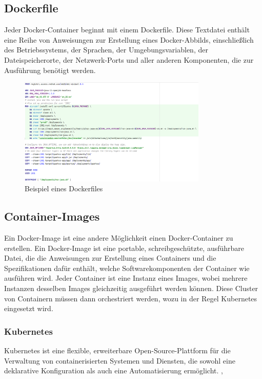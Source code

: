 \subsection{Dockerfile}
Jeder Docker-Container beginnt mit einem Dockerfile. Diese Textdatei enthält eine 
Reihe von Anweisungen zur Erstellung eines Docker-Abbilds, einschließlich des Betriebssystems, 
der Sprachen, der Umgebungsvariablen, der Dateispeicherorte, der Netzwerk-Ports und aller anderen 
Komponenten, die zur Ausführung benötigt werden.

\begin{figure}[H]
  \includegraphics[width=0.8\textwidth]{pics/Bsp_Dockerfile.PNG}
  \centering
  \caption{Beispiel eines Dockerfiles}
\end{figure}

\subsection{Container-Images}
Ein Docker-Image ist eine andere Möglichkeit einen Docker-Container zu erstellen.
Ein Docker-Image ist eine portable, schreibgeschützte, ausführbare Datei, die die Anweisungen zur 
Erstellung eines Containers und die Spezifikationen dafür enthält, welche Softwarekomponenten der 
Container wie ausführen wird. Jeder Container ist eine Instanz eines Images, wobei mehrere Instanzen 
desselben Images gleichzeitig ausgeführt werden können. Diese Cluster von Containern müssen dann orchestriert werden, 
wozu in der Regel Kubernetes eingesetzt wird. \cite{noauthor_docker_nodate-2}

\subsubsection{Kubernetes}
Kubernetes ist eine flexible, erweiterbare Open-Source-Plattform für die Verwaltung von
containerisierten Systemen und Diensten, die sowohl eine deklarative Konfiguration als auch eine 
Automatisierung ermöglicht. \cite{noauthor_kubernetes_2021}, \cite{noauthor_was_nodate-7}

